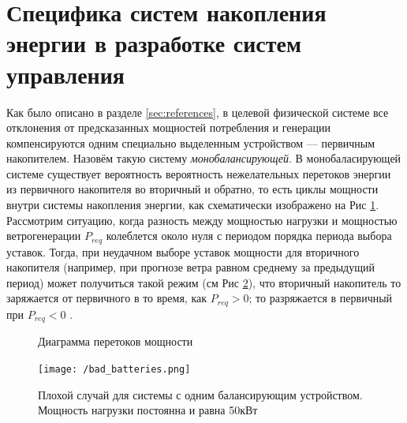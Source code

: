\section{Специфика систем накопления энергии в разработке систем управления}


Как было описано в разделе \ref{sec:references}, в целевой физической системе все отклонения от предсказанных мощностей потребления и генерации компенсируются одним специально выделенным устройством --- первичным накопителем.
Назовём такую систему \textit{монобалансирующей}.
В монобаласирующей системе существует вероятность вероятность нежелательных перетоков энергии из первичного накопителя во вторичный и обратно, то есть циклы мощности внутри системы накопления энергии, как схематически изображено на Рис \ref{fig:power_flow_graph}.
Рассмотрим ситуацию, когда разность между мощностью нагрузки и мощностью ветрогенерации $P_{req}$  колеблется около нуля с периодом порядка периода выбора уставок.
Тогда, при неудачном выборе уставок мощности для вторичного накопителя (например, при прогнозе ветра равном среднему за предыдущий период) 
может получиться такой режим (см Рис \ref{fig:bad_batteries}),
что вторичный накопитель то заряжается от первичного в то время, как $P_{req} > 0$; то разряжается в первичный при $P_{req} < 0$ .


\begin{figure}[]
\centering
\caption{Диаграмма перетоков мощности}
\label{fig:power_flow_graph}
\end{figure}

\begin{figure}[]
\texttt{[image: /bad\_batteries.png]}
\centering
\caption{Плохой случай для системы с одним балансирующим устройством. Мощность нагрузки постоянна и равна 50кВт}
\label{fig:bad_batteries}
\end{figure}

